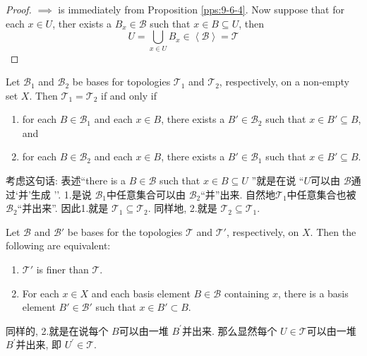 \documentclass[../main.tex]{subfiles}
\begin{document}
\begin{proof}
     \(  \implies   \) is immediately from Proposition \ref{pps:9-6-4}. Now suppose that  for each  \(  x\in U  \), ther exists a \(  B_{x}\in \mathcal{B}  \) such that \(  x \in B\subseteq U  \), then    \[
     U= \bigcup _{x \in U}B_{x}\in \left<\mathcal{B} \right>= \mathcal{T}
     \]
\end{proof}

\begin{proposition}{}{}
Let $\mathcal{B}_1$ and $\mathcal{B}_2$ be bases for topologies $\mathcal{T}_1$ and $\mathcal{T}_2$, respectively, on a non-empty set $X$. Then $\mathcal{T}_1 = \mathcal{T}_2$ if and only if
\begin{enumerate}
    \item for each $B \in \mathcal{B}_1$ and each $x \in B$, there exists a $B' \in \mathcal{B}_2$ such that $x \in B' \subseteq B$, and
    \item for each $B \in \mathcal{B}_2$ and each $x \in B$, there exists a $B' \in \mathcal{B}_1$ such that $x \in B' \subseteq B$.
\end{enumerate}
\end{proposition}

\begin{proofsketch}
    考虑这句话: 表述``there is a \(  B \in \mathcal{B}  \) such that \(  x \in B\subseteq U  \)  ''就是在说  ``\(  U  \)可以由 \(  \mathcal{B}  \)通过`并'生成 ''. 1.是说 \(  \mathcal{B}_{1}  \)中任意集合可以由 \(  \mathcal{B}_{2}  \)``并''出来. 自然地\(  \mathcal{T}_{1}  \)中任意集合也被 \(  \mathcal{B}_{2}  \)``并出来''. 因此1.就是 \(  \mathcal{T}_{1}\subseteq \mathcal{T}_{2}  \). 同样地,  2.就是 \(  \mathcal{T}_{2}\subseteq \mathcal{T}_{1}  \).      
\end{proofsketch}


\begin{lemma}{}{}
Let $\mathcal{B}$ and $\mathcal{B}'$ be bases for the topologies $\mathcal{T}$ and $\mathcal{T}'$, respectively, on $X$. Then the following are equivalent:
\begin{enumerate}
\item $\mathcal{T}'$ is finer than $\mathcal{T}$.
\item For each $x \in X$ and each basis element $B \in \mathcal{B}$ containing $x$, there is a basis element $B' \in \mathcal{B}'$ such that $x \in B' \subset B$.
\end{enumerate}
\end{lemma}

\begin{proofsketch}
    同样的, 2.就是在说每个 \(  B  \)可以由一堆 \(  B^{\prime}   \)并出来. 那么显然每个 \(  U\in \mathcal{T}  \)可以由一堆 \(  B^{\prime}   \)并出来, 即 \(  U^{\prime}  \in \mathcal{T}  \).     
\end{proofsketch}
\end{document}
